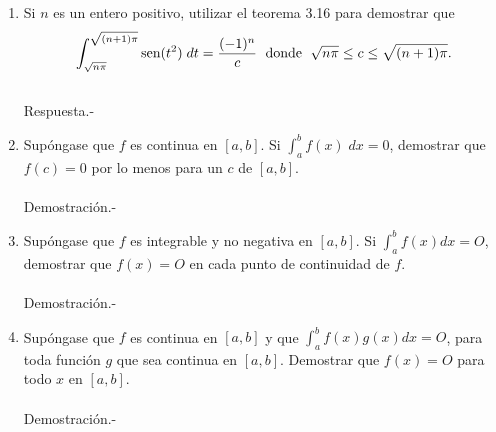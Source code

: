 \begin{enumerate}[\bfseries 1.]
\begin{enumerate}[a)]
	\end{enumerate}

    \item Si $n$ es un entero positivo, utilizar el teorema 3.16 para demostrar que
    $$\int_{\sqrt{n\pi}}^{\sqrt{(n+1)\pi}}\mathop{\mbox{\normalfont sen}}\nolimits(t^2)\; dt = \dfrac{(-1)^n}{c}\; \mbox{ donde }\; \sqrt{n\pi}\leq c \leq \sqrt{(n+1)\pi}.$$\\
	Respuesta.-\;

    \item Supóngase que $f$ es continua en $[a,b]$. Si $\int_a^b f(x)\; dx=0$, demostrar que $f(c)=0$ por lo menos para un $c$ de $[a,b]$.\\\\
	Demostración.-\; 

    \item Supóngase que $f$ es integrable y no negativa en $[a, b]$. Si $\int_a^b f(x) dx = O$, demostrar que $f(x) = O$ en cada punto de continuidad de $f$.\\\\
	Demostración.-\;

    \item Supóngase que $f$ es continua en $[a, b]$ y que $\int_a^b f(x)g(x) dx = O$, para toda función $g$ que sea continua en $[a, b]$. Demostrar que $f(x) = O$ para todo $x$ en $[a, b].$\\\\
	Demostración.-\;



\end{enumerate}


